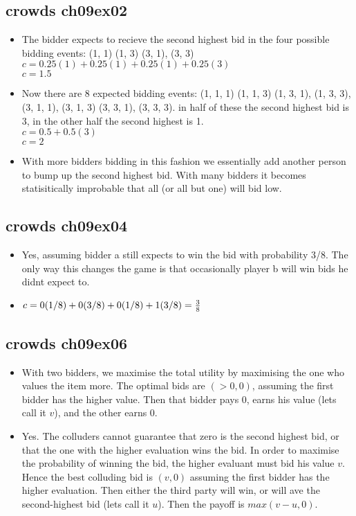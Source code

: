 \documentclass{article}
\begin{document}
\subsection{crowds ch09ex02}
\begin{itemize}
	\item The bidder expects to recieve the second highest bid in the four possible bidding events: (1, 1) (1, 3) (3, 1), (3, 3) \\
			$c = 0.25(1) + 0.25(1) + 0.25(1) + 0.25(3)$ \\
			$c = 1.5$
	\item Now there are  8 expected bidding events: (1, 1, 1) (1, 1, 3) (1, 3, 1), (1, 3, 3), (3, 1, 1), (3, 1, 3) (3, 3, 1), (3, 3, 3).
			in half of these the second highest bid is 3, in the other half the second highest is 1. \\
			$c = 0.5 + 0.5(3)$ \\
			$c = 2$
	\item With more bidders bidding in this fashion we essentially add another person to bump up the second highest bid.
			With many bidders it becomes statisitically improbable that all (or all but one) will bid low.
\end{itemize}

\subsection{crowds ch09ex04}
\begin{itemize}
	\item Yes, assuming bidder a still expects to win the bid with probability 3/8.
			The only way this changes the game is that occasionally player b will win bids he didnt expect to.
	\item $c = 0(1/8) + 0(3/8) + 0(1/8) + 1(3/8) = {3 \over 8}$
\end{itemize}

\subsection{crowds ch09ex06}
\begin{itemize}
	\item With two bidders, we maximise the total utility by maximising the one who values the item more.
			The optimal bids are $(>0, 0)$, assuming the first bidder has the higher value.
			Then that bidder pays 0, earns his value (lets call it $v$), and the other earns 0.
	\item Yes.
			The colluders cannot guarantee that zero is the second highest bid, or that the one with the higher evaluation wins the bid.
			In order to maximise the probability of winning the bid, the higher evaluant must bid his value $v$.
			Hence the best colluding bid is $(v, 0)$ assuming the first bidder has the higher evaluation.
			Then either the third party will win, or will ave the second-highest bid (lets call it $u$).
			Then the payoff is $max(v-u, 0)$.
\end{itemize}
\end{document}
